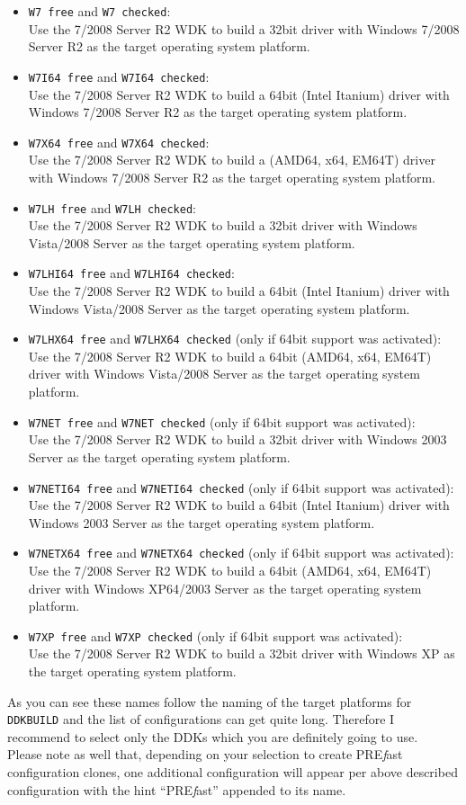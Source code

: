 \documentclass[a4paper,titlepage]{report}
\newcommand{\prefast}[0]{\textsf{PRE\textsl{f}ast}}
\newcommand{\solcfg}[2]{\texttt{#1 free} and \texttt{#1 checked}:\\#2}
\newcommand{\solcfgsixfour}[2]{\texttt{#1 free} and \texttt{#1 checked} \textcolor[gray]{0.40}{\textsf{\small(only if 64bit support was activated)}}:\\#2}
\begin{document}
\begin{itemize}
  \item \solcfg{W7}{Use the 7/2008 Server R2 WDK to build a 32bit driver with Windows 7/2008 Server R2 as the target operating system platform.}
  \item \solcfg{W7I64}{Use the 7/2008 Server R2 WDK to build a 64bit (Intel Itanium) driver with Windows 7/2008 Server R2 as the target operating system platform.}
  \item \solcfg{W7X64}{Use the 7/2008 Server R2 WDK to build a (AMD64, x64, EM64T) driver with Windows 7/2008 Server R2 as the target operating system platform.}
  \item \solcfg{W7LH}{Use the 7/2008 Server R2 WDK to build a 32bit driver with Windows Vista/2008 Server as the target operating system platform.}
  \item \solcfg{W7LHI64}{Use the 7/2008 Server R2 WDK to build a 64bit (Intel Itanium) driver with Windows Vista/2008 Server as the target operating system platform.}
  \item \solcfgsixfour{W7LHX64}{Use the 7/2008 Server R2 WDK to build a 64bit (AMD64, x64, EM64T) driver with Windows Vista/2008 Server as the target operating system platform.}
  \item \solcfgsixfour{W7NET}{Use the 7/2008 Server R2 WDK to build a 32bit driver with Windows 2003 Server as the target operating system platform.}
  \item \solcfgsixfour{W7NETI64}{Use the 7/2008 Server R2 WDK to build a 64bit (Intel Itanium) driver with Windows 2003 Server as the target operating system platform.}
  \item \solcfgsixfour{W7NETX64}{Use the 7/2008 Server R2 WDK to build a 64bit (AMD64, x64, EM64T) driver with Windows XP64/2003 Server as the target operating system platform.}
  \item \solcfgsixfour{W7XP}{Use the 7/2008 Server R2 WDK to build a 32bit driver with Windows XP as the target operating system platform.}
\end{itemize}

As you can see these names follow the naming of the target platforms for \texttt{DDKBUILD}
and the list of configurations can get quite long. Therefore I recommend to select only
the DDKs which you are definitely going to use.\\

Please note as well that, depending on your selection to create \prefast{} configuration
clones, one additional configuration will appear per above described configuration
with the hint ``\prefast{}'' appended to its name.
\end{document}
